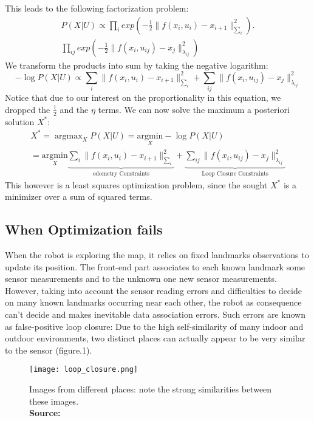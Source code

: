 \documentclass[9pt,technote]{IEEEtran}
\DeclareMathOperator*{\argmax}{argmax} %
\newcommand*{\captionsource}[2]{%
  \caption[{#1}]{%
    #1%
    \\\hspace{\linewidth}%
    \textbf{Source:} #2%
  }%
}
\begin{document}
This leads to the following factorization problem:
\begin{multline}
P(X|U) \propto \prod_{i} exp(-\frac{1}{2}\lVert f(x_{i},u_{i}) - x_{i+1} \rVert_{\sum_{i}}^{2} ) . \\  \prod_{ij} exp(-\frac{1}{2}\lVert f(x_{i},u_{ij}) - x_{j} \rVert_{\lambda_{ij}}^{2} )
\end{multline}
We transform the products into sum by taking the negative logarithm:
\begin{equation}
-\log{P(X|U)} \propto \sum_{i} \lVert f(x_{i},u_{i}) - x_{i+1} \rVert_{\sum_{i}}^{2}  + \sum_{ij} \lVert f(x_{i},u_{ij}) - x_{j} \rVert_{\lambda_{ij}}^{2} 
\end{equation}
Notice that due to our interest on the proportionality in this equation, we dropped the $\frac{1}{2}$ and the $\eta$ terms.
We can now solve the maximum a posteriori solution $X^*$:
\begin{multline}
X^* = \argmax_X P(X|U) = \underset{X}{\mathrm{argmin}} -\log P(X|U)  \\  
	= \underset{X}{\mathrm{argmin}} \underbrace{\sum_{i} \lVert f(x_{i},u_{i}) - x_{i+1} \rVert_{\sum_{i}}^{2}}_\text{odometry Constraints}  + \underbrace{\sum_{ij} \lVert f(x_{i},u_{ij}) - x_{j} \rVert_{\lambda_{ij}}^{2}}_\text{Loop Closure Constraints}
\end{multline}
This however is a least squares optimization problem, since the sought $X^{*}$ is a minimizer over a sum of squared terms.
\subsection{When Optimization fails}
When the robot is exploring the map, it relies on fixed landmarks observations to update its position. The front-end part associates to each known landmark some sensor measurements and to the unknown one new sensor measurements. However, taking into account the sensor reading errors and difficulties to decide on many known landmarks occurring near each other, the robot as consequence can't decide and makes inevitable data association errors. Such errors are known as false-positive loop closure: Due to the high self-similarity of many indoor and outdoor environments, two distinct places can actually appear to be very similar to the sensor (figure.1).
\begin{figure}[h!]
  \centering
  \texttt{[image: loop\_closure.png]}
  \captionsource{Images from different places: note the strong similarities between these images. }{\cite{WinNT}}
\end{figure}
\end{document}
